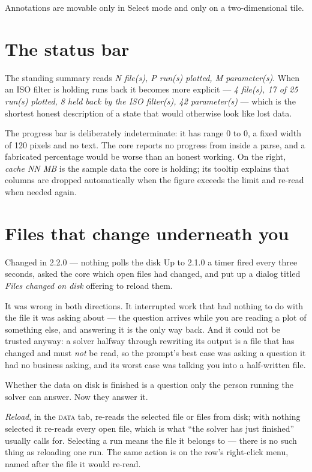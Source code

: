 \documentclass[11pt,a4paper,oneside]{report}
\newcommand{\appver}{2.2.0}
\newcommand{\tab}[1]{\textsc{#1}}
\begin{document}
Annotations are movable only in Select mode and only on a two-dimensional tile.

\section{The status bar}

The standing summary reads \emph{N file(s), P run(s) plotted, M parameter(s)}.
When an ISO filter is holding runs back it becomes more explicit ---
\emph{4 file(s), 17 of 25 run(s) plotted, 8 held back by the ISO filter(s), 42
parameter(s)} --- which is the shortest honest description of a state that would
otherwise look like lost data.

The progress bar is deliberately indeterminate: it has range 0 to 0, a fixed
width of 120 pixels and no text. The core reports no progress from inside a
parse, and a fabricated percentage would be worse than an honest working. On the
right, \emph{cache NN MB} is the sample data the core is holding; its tooltip
explains that columns are dropped automatically when the figure exceeds the
limit and re-read when needed again.

\section{Files that change underneath you}
\label{sec:reload}

\begin{aoenew}{Changed in \appver{} --- nothing polls the disk}
Up to 2.1.0 a timer fired every three seconds, asked the core which open files
had changed, and put up a dialog titled \emph{Files changed on disk} offering
to reload them.

It was wrong in both directions. It interrupted work that had nothing to do
with the file it was asking about --- the question arrives while you are
reading a plot of something else, and answering it is the only way back. And it
could not be trusted anyway: a solver halfway through rewriting its output is a
file that has changed and must \emph{not} be read, so the prompt's best case
was asking a question it had no business asking, and its worst case was talking
you into a half-written file.

Whether the data on disk is finished is a question only the person running the
solver can answer. Now they answer it.
\end{aoenew}

\emph{Reload}, in the \tab{data} tab, re-reads the selected file or files from
disk; with nothing selected it re-reads every open file, which is what ``the
solver has just finished'' usually calls for. Selecting a run means the file it
belongs to --- there is no such thing as reloading one run. The same action is
on the row's right-click menu, named after the file it would re-read.
\end{document}
